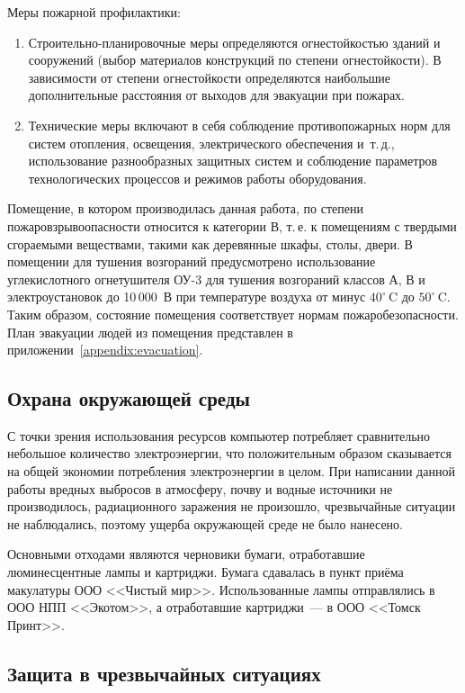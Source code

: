 Меры пожарной профилактики:
\begin{enumerate}[leftmargin=0pt,itemindent=\parindent+\labelwidth+\labelsep]
    \item Строительно-планировочные меры определяются огнестойкостью зданий и сооружений (выбор материалов конструкций по степени огнестойкости). 
    В зависимости от степени огнестойкости определяются наибольшие дополнительные расстояния от выходов для эвакуации при пожарах.
    \item Технические меры включают в себя соблюдение противопожарных норм для систем отопления, освещения, электрического обеспечения и~т.\,д., использование разнообразных защитных систем и соблюдение параметров технологических процессов и режимов работы оборудования.
\end{enumerate}

Помещение, в котором производилась данная работа, по степени пожаровзрывоопасности относится к категории В, т.\,е. к помещениям с твердыми сгораемыми веществами, такими как деревянные шкафы, столы, двери.
В помещении для тушения возгораний предусмотрено использование углекислотного огнетушителя ОУ-3 для тушения возгораний классов А, В и электроустановок до 10\,000~В при температуре воздуха от минус $40^\circ$\,C до $50^\circ$\,C. 
Таким образом, состояние помещения соответствует нормам пожаробезопасности. 
План эвакуации людей из помещения представлен в приложении~\ref{appendix:evacuation}.


\subsection{Охрана окружающей среды}

С точки зрения использования ресурсов компьютер потребляет сравнительно небольшое количество электроэнергии, что положительным образом сказывается на общей экономии потребления электроэнергии в целом.
При написании данной работы вредных выбросов в атмосферу, почву и водные источники не производилось, радиационного заражения не произошло, чрезвычайные ситуации не наблюдались, поэтому ущерба окружающей среде не было нанесено.

Основными отходами являются черновики бумаги, отработавшие люминесцентные лампы и картриджи.
Бумага сдавалась в пункт приёма макулатуры ООО <<Чистый мир>>.
Использованные лампы отправлялись в ООО НПП <<Экотом>>, а отработавшие картриджи~--- в ООО <<Томск Принт>>.


\subsection{Защита в чрезвычайных ситуациях}

